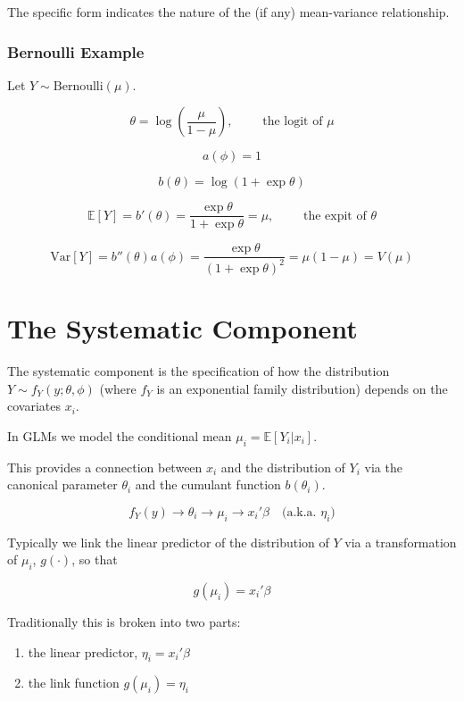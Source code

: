 \documentclass[
  letterpaper,
  DIV=11,
  numbers=noendperiod]{scrreport}
\providecommand{\tightlist}{%
  \setlength{\itemsep}{0pt}\setlength{\parskip}{0pt}}\usepackage{longtable,booktabs,array}
\begin{document}
The specific form indicates the nature of the (if any) mean-variance
relationship.

\hypertarget{bernoulli-example}{%
\subsection{Bernoulli Example}\label{bernoulli-example}}

Let \(Y \sim \text{Bernoulli}(\mu)\).

\[\theta = \log \left( \frac{\mu}{1-\mu} \right), \quad \quad \text{ the logit of } \mu\]

\[a(\phi) = 1\]

\[b(\theta) = \log(1 + \exp \theta)\]

\[\mathbb E[Y] = b'(\theta) = \frac{\exp \theta }{1 + \exp \theta} = \mu, \quad \quad \text{ the expit of } \theta\]

\[\text{Var}[Y] = b''(\theta)a(\phi) = \frac{\exp \theta}{(1 + \exp \theta)^2} = \mu(1 - \mu) = V(\mu)\]


\hypertarget{the-systematic-component}{%
\chapter{The Systematic Component}\label{the-systematic-component}}

The systematic component is the specification of how the distribution
\(Y \sim f_Y(y; \theta, \phi)\) (where \(f_Y\) is an exponential family
distribution) depends on the covariates \(x_i\).

In GLMs we model the conditional mean \(\mu_i = \mathbb E[Y_i | x_i].\)

This provides a connection between \(x_i\) and the distribution of
\(Y_i\) via the canonical parameter \(\theta_i\) and the cumulant
function \(b(\theta_i)\).

\[f_Y(y) \longrightarrow \theta_i \longrightarrow \mu_i \longrightarrow x_i'\beta \quad \text{(a.k.a. }\eta_i)\]

Typically we link the linear predictor of the distribution of \(Y\) via
a transformation of \(\mu_i\), \(g(\cdot)\), so that

\[g(\mu_i) = x_i'\beta\]

Traditionally this is broken into two parts:

\begin{enumerate}
\def\labelenumi{\arabic{enumi}.}
\tightlist
\item
  the linear predictor, \(\eta_i = x_i' \beta\)
\item
  the link function \(g(\mu_i) = \eta_i\)
\end{enumerate}
\end{document}
